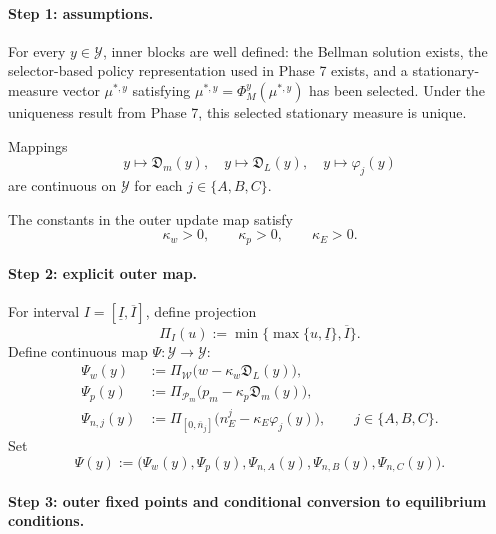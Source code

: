 \paragraph{Step 1: assumptions.}

\begin{assumption}
For every $y\in\mathcal Y$, inner blocks are well defined: the Bellman solution exists, the selector-based policy representation used in Phase 7 exists, and a stationary-measure vector $\mu^{*,y}$ satisfying $\mu^{*,y}=\Phi_M^y(\mu^{*,y})$ has been selected. Under the uniqueness result from Phase 7, this selected stationary measure is unique.
\end{assumption}

\begin{assumption}[E2: Continuity]
Mappings
\[
y\mapsto\mathfrak D_m(y),\quad y\mapsto\mathfrak D_L(y),\quad y\mapsto\varphi_j(y)
\]
are continuous on $\mathcal Y$ for each $j\in\{A,B,C\}$.
\end{assumption}

\begin{assumption}
The constants in the outer update map satisfy
\[
\kappa_w>0,
\qquad
\kappa_p>0,
\qquad
\kappa_E>0.
\]
\end{assumption}

\paragraph{Step 2: explicit outer map.}
For interval $I=[\underline I,\overline I]$, define projection
\[
\Pi_I(u):=\min\{\max\{u,\underline I\},\overline I\}.
\]
Define continuous map $\Psi:\mathcal Y\to\mathcal Y$:
\begin{align}
\Psi_w(y)&:=\Pi_{\mathcal W}\bigl(w-\kappa_w\mathfrak D_L(y)\bigr),
\label{eq:p8_psiw}\\
\Psi_p(y)&:=\Pi_{\mathcal P_m}\bigl(p_m-\kappa_p\mathfrak D_m(y)\bigr),
\label{eq:p8_psip}\\
\Psi_{n,j}(y)&:=\Pi_{[0,\overline n_j]}\bigl(n_E^j-\kappa_E\varphi_j(y)\bigr),
\qquad j\in\{A,B,C\}.
\label{eq:p8_psin}
\end{align}
Set
\[
\Psi(y):=\bigl(\Psi_w(y),\Psi_p(y),\Psi_{n,A}(y),\Psi_{n,B}(y),\Psi_{n,C}(y)\bigr).
\]

\paragraph{Step 3: outer fixed points and conditional conversion to equilibrium conditions.}

